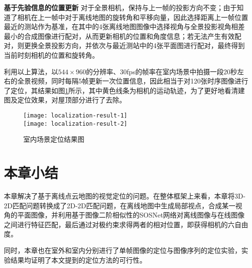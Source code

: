 \textbf{基于先验信息的位置更新} \quad 对于全景相机，保持与上一帧的投影方向不变；由于知道了相机在上一帧中对于离线地图的旋转角和平移向量，因此选择距离上一帧位置最近的测站作为基准，在其中的4张离线地图图像中选择视角与全景投影视角相差最小的合成图像进行配对，从而更新相机的位置和角度信息；若无法产生有效配对，则更换全景投影方向，并依次与最近测站中的4张平面图进行配对，最终得到当前时刻相机的位置和旋转角。

利用以上算法，以$544\times 960$的分辨率、30fps的帧率在室内场景中拍摄一段20秒左右的全景视频，同时每隔5帧更新一次位置信息，因此相当于对120张时序图像进行了定位，其结果如图\ref{localization-result}所示，其中黄色线条为相机的运动轨迹，为了更好地看清建图及定位效果，对屋顶部分进行了去除。

\begin{figure}
	\centering
		{\texttt{[image: localization-result-1]}}\\
	 {\texttt{[image: localization-result-2]}}
	\caption{室内场景定位结果图}
	\label{localization-result}
\end{figure}

\section{本章小结}
本章解决了基于离线点云地图的视觉定位的问题。在整体框架上来看，本章将3D-2D匹配问题转换成了2D-2D匹配问题，在离线地图中生成局部视点，合成某一视角的平面图像，并利用基于图像二阶相似性的SOSNet网络对离线图像与在线图像之间进行特征匹配，最后通过对极约束求得两者的相对位置，即获得相机的六自由度。

同时，本章也在室外和室内分别进行了单帧图像的定位与图像序列的定位实验，实验结果均证明了本文提到的定位方法的可行性。






